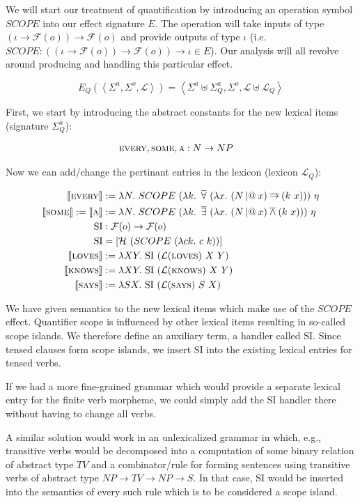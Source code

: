 We will start our treatment of quantification by introducing an operation
symbol $SCOPE$ into our effect signature $E$. The operation will take
inputs of type $(\iota \to \mathcal{F}(o)) \to \mathcal{F}(o)$ and provide
outputs of type $\iota$ (i.e.\ $SCOPE : ((\iota \to \mathcal{F}(o)) \to
\mathcal{F}(o)) \to \iota \in E$). Our analysis will all revolve around
producing and handling this particular effect.

$$
E_Q(\left< \Sigma^a, \Sigma^o, \mathcal{L} \right>) = \left< \Sigma^a \uplus \Sigma^a_Q, \Sigma^o, \mathcal{L} \uplus \mathcal{L}_Q \right>
$$

First, we start by introducing the abstract constants for the new lexical
items (signature $\Sigma^a_Q$):

\begin{align*}
  \textsc{every}, \textsc{some}, \textsc{a} &: N \to NP
\end{align*}

Now we can add/change the pertinant entries in the lexicon (lexicon $\mathcal{L}_Q$):

\begin{align*}
  \lex{every}{\lambda N.\ SCOPE\ (\lambda k.\ \dforall\ (\lambda x.\ (N \apl x) \dimpl (k\ x)))\ \eta} \\
  \sem{\abs{some}} := \sem{\abs{a}} &:= \lambda N.\ SCOPE\ (\lambda k.\ \dexists\ (\lambda x.\ (N \apl x) \dand (k\ x)))\ \eta \\
  \mathrm{SI} &: \mathcal{F}(o) \to \mathcal{F}(o) \\
  \mathrm{SI} &= [\mathcal{H}\ (SCOPE\ (\lambda c k.\ c\ k))] \\
  \lex{loves}{\lambda X Y.\ \mathrm{SI}\ (\mathcal{L}(\abs{loves})\ X\ Y)} \\
  \lex{knows}{\lambda X Y.\ \mathrm{SI}\ (\mathcal{L}(\abs{knows})\ X\ Y)} \\
  \lex{says}{\lambda S X.\ \mathrm{SI}\ (\mathcal{L}(\abs{says})\ S\ X)} \\
\end{align*}

We have given semantics to the new lexical items which make use of the
$SCOPE$ effect. Quantifier scope is influenced by other lexical items
resulting in so-called scope islands. We therefore define an auxiliary
term, a handler called $\mathrm{SI}$. Since tensed clauses form scope
islands, we insert $\mathrm{SI}$ into the existing lexical entries
for tensed verbs.

If we had a more fine-grained grammar which would provide a separate
lexical entry for the finite verb morpheme, we could simply add the
$\mathrm{SI}$ handler there without having to change all verbs.

A similar solution would work in an unlexicalized grammar in which, e.g.,
transitive verbs would be decomposed into a computation of some binary
relation of abstract type $TV$ and a combinator/rule for forming sentences
using transitive verbs of abstract type $NP \to TV \to NP \to S$. In that
case, $\mathrm{SI}$ would be inserted into the semantics of every
such rule which is to be considered a scope island.
